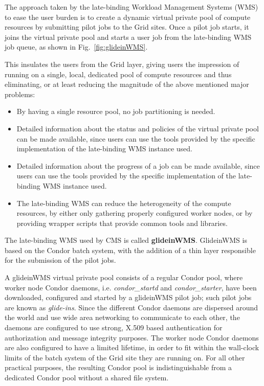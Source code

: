 \documentclass[a4paper]{jpconf}
\begin{document}
The approach taken by the late-binding Workload Management Systems (WMS) to ease the user burden is 
to create a dynamic virtual private pool of compute resources by submitting pilot jobs to the Grid sites.
Once a pilot job starts, it joins the virtual private pool and starts a user job from the late-binding WMS job queue, 
as shown in Fig.~\ref{fig:glideinWMS}.

This insulates the users from the Grid layer, giving users
the impression of running on a single, local, dedicated pool of compute resources
and thus eliminating, or at least reducing the magnitude of the above mentioned major problems:
\begin {itemize}
\item 
By having a single resource pool, no job partitioning is needed.
\item
Detailed information about the status and policies of the virtual private pool can be made available, 
since users can use the tools provided by the specific implementation of the late-binding WMS instance used.
\item 
Detailed information about the progress of a job can be made available,
since users can use the tools provided by the specific implementation of the late-binding WMS instance used.
\item
The late-binding WMS can reduce the heterogeneity of the compute resources, 
by either only gathering properly configured worker nodes,
or by providing wrapper scripts that provide common tools and libraries.
\end{itemize}

The late-binding WMS used by CMS is called \textbf{glideinWMS}. GlideinWMS is based on the Condor batch system, 
with the addition of a thin layer responsible for the submission of the pilot jobs.

A glideinWMS virtual private pool consists of a regular Condor pool, 
where worker node Condor daemons, i.e. \emph{condor\_startd} and \emph{condor\_starter}, 
have been downloaded, configured and started by a glideinWMS pilot job; such pilot jobs are known as \emph{glide-ins}. 
Since the different Condor daemons are dispersed around the world and use wide area networking to communicate to each other,
the daemons are configured to use strong, X.509 based authentication for authorization and message integrity purposes.
The worker node Condor daemons are also configured to have a limited lifetime, in order to fit within the wall-clock limits 
of the batch system of the Grid site they are running on.
For all other practical purposes, the resulting Condor pool is indistinguishable from a dedicated Condor pool without a shared file system.
\end{document}
